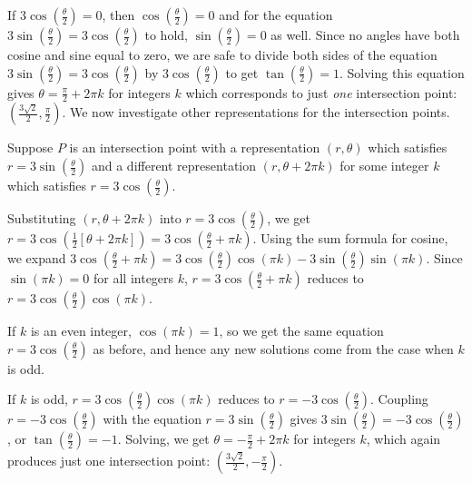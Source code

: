 \documentclass{ximera}
\begin{document}
\begin{example}
\begin{explanation}
\begin{enumerate}
If $3\cos\left(\frac{\theta}{2}\right) = 0$, then $\cos\left(\frac{\theta}{2}\right) = 0$ and for the equation $3\sin\left(\frac{\theta}{2}\right) =  3\cos\left(\frac{\theta}{2}\right)$ to hold, $\sin\left(\frac{\theta}{2}\right) = 0$ as well.  Since no angles have both cosine and sine equal to zero, we are safe to divide both sides of the equation  $3\sin\left(\frac{\theta}{2}\right) =  3\cos\left(\frac{\theta}{2}\right)$ by  $3\cos\left(\frac{\theta}{2}\right)$ to get $\tan\left(\frac{\theta}{2}\right) = 1$.  Solving this equation gives  $\theta =  \frac{\pi}{2} + 2\pi k$ for integers $k$ which corresponds to just \textit{one} intersection point:  $\left( \frac{3\sqrt{2}}{2}, \frac{\pi}{2}\right)$.  We now investigate other representations for the intersection points.  



Suppose $P$ is an intersection point with a representation $(r,\theta)$ which satisfies $r =  3\sin\left(\frac{\theta}{2}\right)$ and  a  different representation $(r, \theta + 2\pi k)$ for some integer $k$ which satisfies $r =  3\cos\left(\frac{\theta}{2}\right)$.  



Substituting $(r, \theta + 2\pi k)$  into $r =  3\cos\left(\frac{\theta}{2}\right)$, we get $r = 3\cos\left(\frac{1}{2} \left[ \theta + 2\pi k\right]\right) = 3\cos\left(\frac{\theta}{2} + \pi k\right)$.  Using the sum formula for cosine, we expand  $3\cos\left(\frac{\theta}{2} + \pi k\right) = 3\cos\left(\frac{\theta}{2}\right) \cos(\pi k) - 3\sin\left(\frac{\theta}{2}\right)\sin\left(\pi k\right)$.  Since $\sin(\pi k) = 0$  for all integers $k$,  $r=3\cos\left(\frac{\theta}{2} + \pi k\right)$ reduces to  $r=3\cos\left(\frac{\theta}{2}\right)\cos\left(\pi k\right)$.


If $k$ is an even integer, $\cos\left(\pi k \right)  = 1$, so we get the same equation $r = 3\cos\left(\frac{\theta}{2}\right)$ as before, and hence any new solutions come from the case when $k$ is odd.



If $k$ is odd, $r=3\cos\left(\frac{\theta}{2}\right)\cos\left(\pi k\right)$ reduces to $r = -3\cos\left(\frac{\theta}{2}\right)$.  Coupling $r = -3\cos\left(\frac{\theta}{2}\right)$ with the equation $r = 3\sin\left(\frac{\theta}{2}\right)$ gives  $3\sin\left(\frac{\theta}{2}\right) = -3\cos\left(\frac{\theta}{2}\right)$, or $\tan\left(\frac{\theta}{2}\right) = -1$. Solving, we get $\theta = -\frac{\pi}{2} + 2\pi k$ for integers $k$, which again produces just one intersection point:  $\left(\frac{3\sqrt{2}}{2},-\frac{\pi}{2}\right)$.  




\end{enumerate}
\end{explanation}
\end{example}
\end{document}
